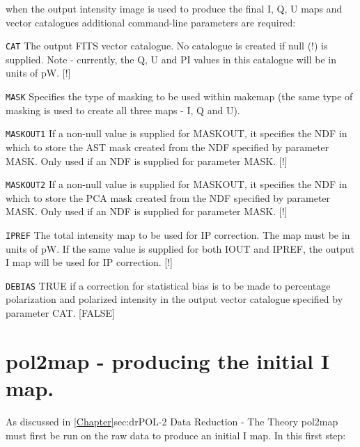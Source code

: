 when the output intensity image is used to produce the final I, Q, U 
maps and vector catalogues additional command-line parameters are required:

\begin{aligndesc}

\item[\texttt{CAT}]
The output FITS vector catalogue. No catalogue is created if
null (!) is supplied. Note - currently, the Q, U  and PI values
in this catalogue will be in units of pW. [!]


\item[\texttt{MASK}]
Specifies the type of masking to be used within makemap (the
same type of masking is used to create all three maps - I, Q
and U).


\item[\texttt{MASKOUT1}]
If a non-null value is supplied for MASKOUT, it specifies the NDF
in which to store the AST mask created from the NDF specified by
parameter MASK. Only used if an NDF is supplied for parameter
MASK. [!]


\item[\texttt{MASKOUT2}]
If a non-null value is supplied for MASKOUT, it specifies the NDF
in which to store the PCA mask created from the NDF specified by
parameter MASK. Only used if an NDF is supplied for parameter
MASK. [!]


\item[\texttt{IPREF}]
The total intensity map to be used for IP correction. The map must
be in units of pW. If the same value is supplied for both IOUT
and IPREF, the output I map will be used for IP correction. [!]

\item[\texttt{DEBIAS}]
TRUE if a correction for statistical bias is to be made to
percentage polarization and polarized intensity in the output
vector catalogue specified by parameter CAT. [FALSE]



\end{aligndesc}



\section{pol2map - producing the initial I map.}

As discussed in \cref{Chapter}{sec:dr}{POL-2 Data Reduction - The Theory} pol2map must first be run on the raw data to produce an initial I map.
In this first step:

